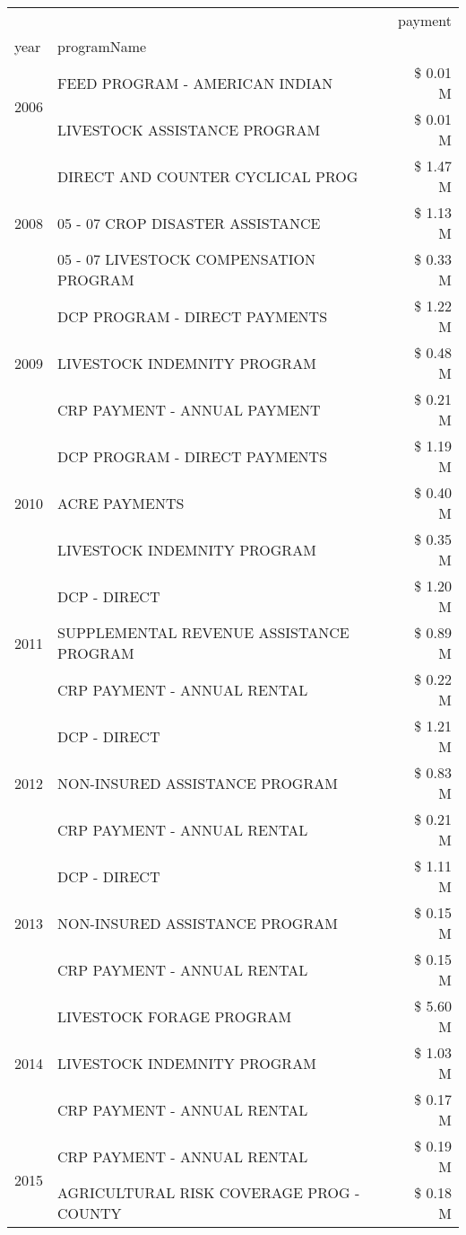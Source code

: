 \begin{tabular}{llr}
\toprule
 &  & payment \\
year & programName &  \\
\midrule
\multirow[t]{2}{*}{2006} & FEED PROGRAM - AMERICAN INDIAN & \$ 0.01 M \\
 & LIVESTOCK ASSISTANCE PROGRAM & \$ 0.01 M \\
\cline{1-3}
\multirow[t]{3}{*}{2008} & DIRECT AND COUNTER CYCLICAL PROG & \$ 1.47 M \\
 & 05 - 07 CROP DISASTER ASSISTANCE & \$ 1.13 M \\
 & 05 - 07 LIVESTOCK COMPENSATION PROGRAM & \$ 0.33 M \\
\cline{1-3}
\multirow[t]{3}{*}{2009} & DCP PROGRAM - DIRECT PAYMENTS & \$ 1.22 M \\
 & LIVESTOCK INDEMNITY PROGRAM & \$ 0.48 M \\
 & CRP PAYMENT - ANNUAL PAYMENT & \$ 0.21 M \\
\cline{1-3}
\multirow[t]{3}{*}{2010} & DCP PROGRAM - DIRECT PAYMENTS & \$ 1.19 M \\
 & ACRE PAYMENTS & \$ 0.40 M \\
 & LIVESTOCK INDEMNITY PROGRAM & \$ 0.35 M \\
\cline{1-3}
\multirow[t]{3}{*}{2011} & DCP - DIRECT & \$ 1.20 M \\
 & SUPPLEMENTAL REVENUE ASSISTANCE PROGRAM & \$ 0.89 M \\
 & CRP PAYMENT - ANNUAL RENTAL & \$ 0.22 M \\
\cline{1-3}
\multirow[t]{3}{*}{2012} & DCP - DIRECT & \$ 1.21 M \\
 & NON-INSURED ASSISTANCE PROGRAM & \$ 0.83 M \\
 & CRP PAYMENT - ANNUAL RENTAL & \$ 0.21 M \\
\cline{1-3}
\multirow[t]{3}{*}{2013} & DCP - DIRECT & \$ 1.11 M \\
 & NON-INSURED ASSISTANCE PROGRAM & \$ 0.15 M \\
 & CRP PAYMENT - ANNUAL RENTAL & \$ 0.15 M \\
\cline{1-3}
\multirow[t]{3}{*}{2014} & LIVESTOCK FORAGE PROGRAM & \$ 5.60 M \\
 & LIVESTOCK INDEMNITY PROGRAM & \$ 1.03 M \\
 & CRP PAYMENT - ANNUAL RENTAL & \$ 0.17 M \\
\cline{1-3}
\multirow[t]{3}{*}{2015} & CRP PAYMENT - ANNUAL RENTAL & \$ 0.19 M \\
 & AGRICULTURAL RISK COVERAGE PROG - COUNTY & \$ 0.18 M \\

\end{tabular}
